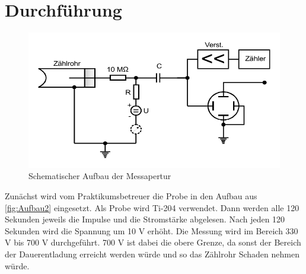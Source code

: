 \section{Durchführung}
\label{sec:Durchführung}

\begin{figure}
    \centering
    \includegraphics[width=0.5 \linewidth]{pictures/Aufbau2.pdf}
    \caption{Schematischer Aufbau der Messapertur}
    \label{fig:Aufbau2}
\end{figure}

Zunächst wird vom Praktikumsbetreuer die Probe in den Aufbau aus \autoref{fig:Aufbau2} eingesetzt.
Als Probe wird Ti-204 verwendet.
Dann werden alle 120 Sekunden jeweils die Impulse und die Stromstärke abgelesen.
Nach jeden 120 Sekunden wird die Spannung um 10 V erhöht.
Die Messung wird im Bereich 330 V bis 700 V durchgeführt.
700 V ist dabei die obere Grenze, da sonst der Bereich der Dauerentladung erreicht werden würde und so das Zählrohr Schaden nehmen würde.
